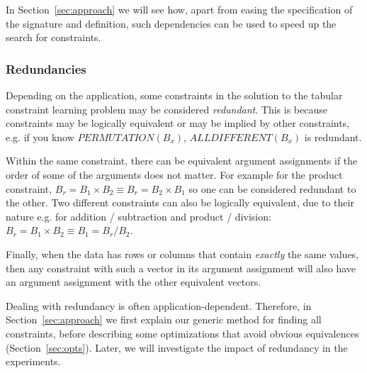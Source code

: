 \documentclass{IEEEtran}
\newcommand{\eccalc}[2]{\ensuremath{#1 = #2}}
\newcommand{\ecalldiff}[1]{\ensuremath{\textit{ALLDIFFERENT}(#1)}}
\newcommand{\ecperm}[1]{\ensuremath{\textit{PERMUTATION}(#1)}}
\newcommand{\ecprod}[3]{\eccalc{#1}{#2 \times #3}}
\newcommand{\ecdiv}[3]{\eccalc{#1}{{#2} / {#3}}}
\newcommand{\sbs}{B}
\newcommand{\sbl}[1]{\ensuremath{\sbs_{\textit{#1}}}}
\theoremstyle{definition}
\begin{document}
In Section~\ref{sec:approach} we will see how, apart from easing the specification of the signature and definition, such dependencies can be used to speed up the search for constraints.

\subsubsection{Redundancies}
\label{sec:form:redundancies}
Depending on the application, some constraints in the solution to the tabular constraint learning problem may be considered \textit{redundant}. This is because constraints may be logically equivalent or may be implied by other constraints, e.g. if you know $\ecperm{\sbl{x}}$, $\ecalldiff{\sbl{x}}$ is redundant.

Within the same constraint, there can be equivalent argument assignments if the order of some of the arguments does not matter. For example for the product constraint, $\ecprod{\sbl{r}}{\sbl{1}}{\sbl{2}} \equiv \ecprod{\sbl{r}}{\sbl{2}}{\sbl{1}}$ so one can be considered redundant to the other.
Two different constraints can also be logically equivalent, due to their nature e.g. for addition / subtraction and product / division: $\ecprod{\sbl{r}}{\sbl{1}}{\sbl{2}} \equiv \ecdiv{\sbl{1}}{\sbl{r}}{\sbl{2}}$.

Finally, when the data has rows or columns that contain \textit{exactly} the same values, then any constraint with such a vector in its argument assignment will also have an argument assignment with the other equivalent vectors.

Dealing with redundancy is often application-dependent.
Therefore, in Section~\ref{sec:approach} we first explain our generic method for finding all constraints, before describing some optimizations that avoid obvious equivalences (Section~\ref{sec:opts}).
Later, we will investigate the impact of redundancy in the experiments.
\end{document}
